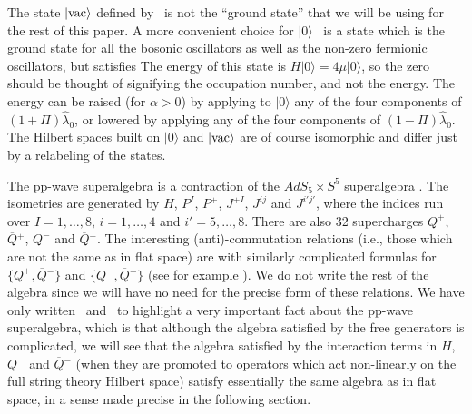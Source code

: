 The state $|{\rm vac}\rangle$ defined
by \vacdef\ is not the ``ground state'' that we will be using
for the rest of this paper.  A more convenient choice
for $|0\rangle$
\MetsaevRE\ is a state which is the ground
state for all the bosonic oscillators as well as the non-zero
fermionic oscillators, but satisfies
\eqn{}
The energy of this state is $H |0 \rangle = 4 \mu |0\rangle$, so the
zero should be thought of signifying the occupation number, and not
the energy.
The energy can be raised (for $\alpha>0$)
by applying to $|0\rangle$ any of the four
components of $(1 + \Pi)
\hat{\lambda}_0$, or lowered
by applying any of the four components of $(1 - \Pi) \hat{\lambda}_0$.
The Hilbert spaces built on $|0\rangle$ and $|{\rm vac}\rangle$ are of course
isomorphic and differ just by a relabeling of the states.



The pp-wave superalgebra is a contraction of the $AdS_5 \times S^5$
superalgebra .
The isometries are
generated by $H$, $P^I$, $P^+$, $J^{+I}$, $J^{ij}$ and $J^{i'j'}$,
where the indices run over
$I=1,\ldots,8$, $i=1,\ldots,4$ and $i'=5,\ldots,8$.
There are also 32 supercharges $Q^+$, $\overline{Q}{}^+$, $Q^-$ and
$\overline{Q}{}^-$.
The interesting (anti)-commutation relations
(i.e., those which are not the same as in flat space)
are
\eqn{}
\eqn{}
with similarly complicated formulas for
$\{ Q^+, \overline{Q}{}^-\}$ and $\{Q^-, \overline{Q}{}^+\}$ (see for
example \MetsaevRE).
We do not write the rest of the algebra since we will have
no need for the precise form of these relations.
We have only written \superone\ and \supertwo\ to highlight
a very important fact about the pp-wave superalgebra, which is
that although the algebra satisfied by the free generators
is complicated, we will see that
the algebra satisfied by the interaction
terms in $H$, $Q^-$ and $\overline{Q}{}^-$ (when they
are promoted to operators which act non-linearly
on the full string theory Hilbert space)
satisfy essentially the same algebra as in flat space,
in a sense made precise in the following section.



